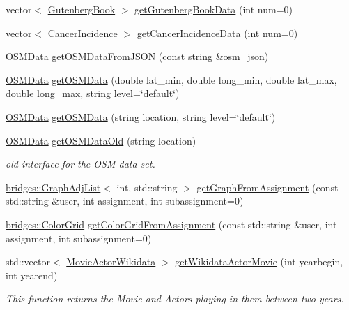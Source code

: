 \begin{DoxyCompactItemize}
\item 
vector$<$ \hyperlink{classbridges_1_1dataset_1_1_gutenberg_book}{Gutenberg\+Book} $>$ \hyperlink{classbridges_1_1_data_source_a1057509d6adf4cbfd881854adb274304}{get\+Gutenberg\+Book\+Data} (int num=0)
\item 
vector$<$ \hyperlink{classbridges_1_1dataset_1_1_cancer_incidence}{Cancer\+Incidence} $>$ \hyperlink{classbridges_1_1_data_source_a52d8161e7c093ab3615acea7085f6689}{get\+Cancer\+Incidence\+Data} (int num=0)
\item 
\hyperlink{classbridges_1_1dataset_1_1_o_s_m_data}{O\+S\+M\+Data} \hyperlink{classbridges_1_1_data_source_a1b483de1cce9921b70116213382cdaf0}{get\+O\+S\+M\+Data\+From\+J\+S\+ON} (const string \&osm\+\_\+json)
\item 
\hyperlink{classbridges_1_1dataset_1_1_o_s_m_data}{O\+S\+M\+Data} \hyperlink{classbridges_1_1_data_source_a57736934a90bdb86948a7c338ec81a2d}{get\+O\+S\+M\+Data} (double lat\+\_\+min, double long\+\_\+min, double lat\+\_\+max, double long\+\_\+max, string level=\char`\"{}default\char`\"{})
\item 
\hyperlink{classbridges_1_1dataset_1_1_o_s_m_data}{O\+S\+M\+Data} \hyperlink{classbridges_1_1_data_source_a3151f5b2a27b5d6b11e1c5cb55d51655}{get\+O\+S\+M\+Data} (string location, string level=\char`\"{}default\char`\"{})
\item 
\hyperlink{classbridges_1_1dataset_1_1_o_s_m_data}{O\+S\+M\+Data} \hyperlink{classbridges_1_1_data_source_a3ae5e11e0b70bed0498cf37b360820c2}{get\+O\+S\+M\+Data\+Old} (string location)
\begin{DoxyCompactList}\small\item\em old interface for the O\+SM data set. \end{DoxyCompactList}\item 
\hyperlink{classbridges_1_1datastructure_1_1_graph_adj_list}{bridges\+::\+Graph\+Adj\+List}$<$ int, std\+::string $>$ \hyperlink{classbridges_1_1_data_source_ac4edf55c163c60f17b13f5499e5d2e65}{get\+Graph\+From\+Assignment} (const std\+::string \&user, int assignment, int subassignment=0)
\item 
\hyperlink{classbridges_1_1datastructure_1_1_color_grid}{bridges\+::\+Color\+Grid} \hyperlink{classbridges_1_1_data_source_aa65136879011e1ec237380ef8587fea2}{get\+Color\+Grid\+From\+Assignment} (const std\+::string \&user, int assignment, int subassignment=0)
\item 
std\+::vector$<$ \hyperlink{classbridges_1_1dataset_1_1_movie_actor_wikidata}{Movie\+Actor\+Wikidata} $>$ \hyperlink{classbridges_1_1_data_source_a25b33736b4ae9ffea5fe4ebf5dbb3a63}{get\+Wikidata\+Actor\+Movie} (int yearbegin, int yearend)
\begin{DoxyCompactList}\small\item\em This function returns the Movie and Actors playing in them between two years. \end{DoxyCompactList}\end{DoxyCompactItemize}


